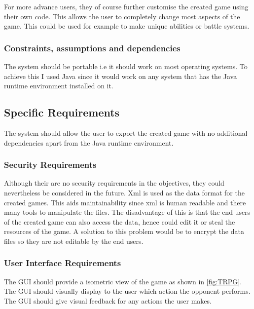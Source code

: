 For more advance users, they of course further customise the created game using their own code. This allows the user to completely change most aspects of the game. This could be used for example to make unique abilities or battle systems.


\subsubsection{Constraints, assumptions and dependencies}
The system should be portable i.e it should work on most operating systems.  To achieve this I used Java  since it would work on any system that has the Java runtime environment installed on it. 



\subsection{Specific Requirements}
The system should allow the user to export the created game with no additional dependencies apart from the Java runtime environment. 

\subsubsection{Security Requirements}
Although their are no security requirements in the objectives, they could nevertheless  be considered in the future. Xml is used as the data format for the created games. This aids maintainability since xml is human readable and there many tools to manipulate the files. The disadvantage of this is that the end users of the created game can also access the data, hence could edit it or steal the resources of the game. A solution to this problem would be to encrypt the data files so they are not editable by the end users.    

\subsubsection{User Interface Requirements}
The GUI should provide a isometric view of the game as shown in \ref{fig:TRPG}. The GUI should visually display to the user  which action the opponent performs. The GUI should give visual feedback for any actions the user makes.



